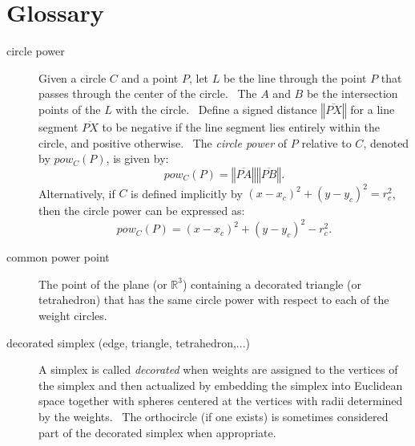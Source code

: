                       


\chapter{Glossary}

\begin{description}
\item[circle power] Given a circle $C$ and a point $P$, let $L$ be the line
through the point $P$ that passes through the center of the circle. \ The $A$
and $B$ be the intersection points of the $L$ with the circle. \ Define a
signed distance $\left\Vert \overline{PX}\right\Vert $ for a line segment $%
\overline{PX}$ to be negative if the line segment lies entirely within the
circle, and positive otherwise. \ The \textit{circle power} of $P$ relative
to $C$, denoted by $pow_{C}\left( P\right) $, is given by:%
\begin{equation*}
pow_{C}\left( P\right) =\left\Vert \overline{PA}\right\Vert \left\Vert 
\overline{PB}\right\Vert .
\end{equation*}%
Alternatively, if $C$ is defined implicitly by $\left( x-x_{c}\right)
^{2}+\left( y-y_{c}\right) ^{2}=r_{c}^{2}$, then the circle power can be
expressed as:%
\begin{equation*}
pow_{C}\left( P\right) =\left( x-x_{c}\right) ^{2}+\left( y-y_{c}\right)
^{2}-r_{c}^{2}.
\end{equation*}

\item[common power point] The point of the plane (or $%
\mathbb{R}
^{3}$) containing a decorated triangle (or tetrahedron) that has the same
circle power with respect to each of the weight circles. \ 

\item[decorated simplex (edge, triangle, tetrahedron,...)] A simplex is
called \textit{decorated} when weights are assigned to the vertices of the
simplex and then actualized by embedding the simplex into Euclidean space
together with spheres centered at the vertices with radii determined by the
weights. \ The orthocircle (if one exists) is sometimes considered part of
the decorated simplex when appropriate.


\end{description}
